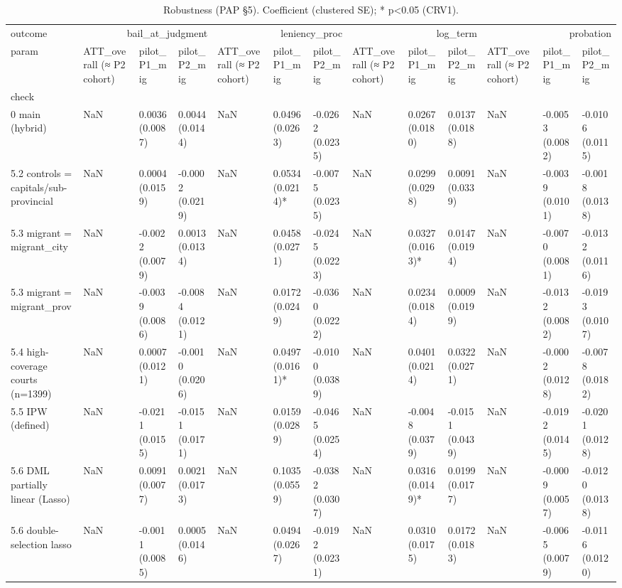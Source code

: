 \begin{table}
\caption{Robustness (PAP §5). Coefficient (clustered SE); * p<0.05 (CRV1).}
\label{tab:robust}
\begin{tabular}{lllllllllllll}
\toprule
outcome & \multicolumn{3}{r}{bail\_at\_judgment} & \multicolumn{3}{r}{leniency\_proc} & \multicolumn{3}{r}{log\_term} & \multicolumn{3}{r}{probation} \\
param & ATT\_overall (≈ P2 cohort) & pilot\_P1\_mig & pilot\_P2\_mig & ATT\_overall (≈ P2 cohort) & pilot\_P1\_mig & pilot\_P2\_mig & ATT\_overall (≈ P2 cohort) & pilot\_P1\_mig & pilot\_P2\_mig & ATT\_overall (≈ P2 cohort) & pilot\_P1\_mig & pilot\_P2\_mig \\
check &  &  &  &  &  &  &  &  &  &  &  &  \\
\midrule
0 main (hybrid) & NaN & 0.0036 (0.0087) & 0.0044 (0.0144) & NaN & 0.0496 (0.0263) & -0.0262 (0.0235) & NaN & 0.0267 (0.0180) & 0.0137 (0.0188) & NaN & -0.0053 (0.0082) & -0.0106 (0.0115) \\
5.2 controls = capitals/sub-provincial & NaN & 0.0004 (0.0159) & -0.0002 (0.0219) & NaN & 0.0534 (0.0214)* & -0.0075 (0.0235) & NaN & 0.0299 (0.0298) & 0.0091 (0.0339) & NaN & -0.0039 (0.0101) & -0.0018 (0.0138) \\
5.3 migrant = migrant\_city & NaN & -0.0022 (0.0079) & 0.0013 (0.0134) & NaN & 0.0458 (0.0271) & -0.0245 (0.0223) & NaN & 0.0327 (0.0163)* & 0.0147 (0.0194) & NaN & -0.0070 (0.0081) & -0.0132 (0.0116) \\
5.3 migrant = migrant\_prov & NaN & -0.0039 (0.0086) & -0.0084 (0.0121) & NaN & 0.0172 (0.0249) & -0.0360 (0.0222) & NaN & 0.0234 (0.0184) & 0.0009 (0.0199) & NaN & -0.0132 (0.0082) & -0.0193 (0.0107) \\
5.4 high-coverage courts (n=1399) & NaN & 0.0007 (0.0121) & -0.0010 (0.0206) & NaN & 0.0497 (0.0161)* & -0.0100 (0.0389) & NaN & 0.0401 (0.0214) & 0.0322 (0.0271) & NaN & -0.0002 (0.0128) & -0.0078 (0.0182) \\
5.5 IPW (defined) & NaN & -0.0211 (0.0155) & -0.0151 (0.0171) & NaN & 0.0159 (0.0289) & -0.0465 (0.0254) & NaN & -0.0048 (0.0379) & -0.0151 (0.0439) & NaN & -0.0192 (0.0145) & -0.0201 (0.0128) \\
5.6 DML partially linear (Lasso) & NaN & 0.0091 (0.0077) & 0.0021 (0.0173) & NaN & 0.1035 (0.0559) & -0.0382 (0.0307) & NaN & 0.0316 (0.0149)* & 0.0199 (0.0177) & NaN & -0.0009 (0.0057) & -0.0120 (0.0138) \\
5.6 double-selection lasso & NaN & -0.0011 (0.0085) & 0.0005 (0.0146) & NaN & 0.0494 (0.0267) & -0.0192 (0.0231) & NaN & 0.0310 (0.0175) & 0.0172 (0.0183) & NaN & -0.0065 (0.0079) & -0.0116 (0.0120) \\

\end{tabular}
\end{table}
